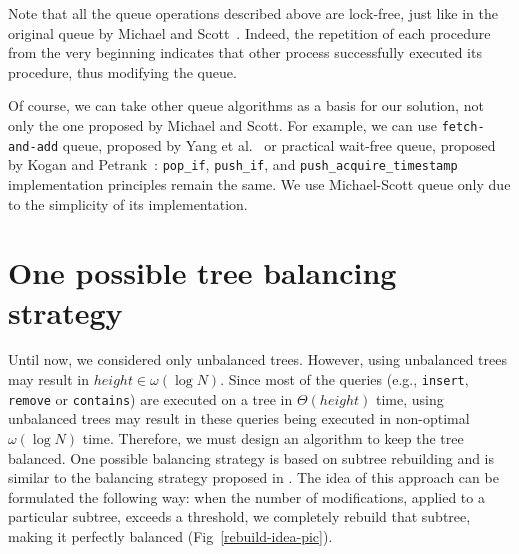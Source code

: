 \documentclass[times, dvipsnames,%
               languages={russian,english} %
              ]{itmo-student-thesis}
\begin{document}
Note that all the queue operations described above are lock-free, just like in the original queue by Michael and Scott~\cite{michael1996simple}. Indeed, the repetition of each procedure from the very beginning indicates that other process successfully executed its procedure, thus modifying the queue.

Of course, we can take other queue algorithms as a basis for our solution, not only the one proposed by Michael and Scott. For example, we can use \texttt{fetch-and-add} queue, proposed by Yang et al.~\cite{yang2016wait} or practical wait-free queue, proposed by Kogan and Petrank~\cite{kogan2011wait}: \texttt{pop\_if}, \texttt{push\_if}, and \texttt{push\_acquire\_timestamp} implementation principles remain the same. We use Michael-Scott queue only due to the simplicity of its implementation. 

\section{One possible tree balancing strategy}
\label{balancing-section}

Until now, we considered only unbalanced trees. However, using unbalanced trees may result in $height \in \omega(\log N)$. Since most of the queries (e.g., \texttt{insert}, \texttt{remove} or \texttt{contains}) are executed on a tree in $\Theta(height)$ time, using unbalanced trees may result in these queries being executed in non-optimal $\omega(\log N)$ time. Therefore, we must design an algorithm to keep the tree balanced. One possible balancing strategy is based on subtree rebuilding and is similar to the balancing strategy proposed in \cite{brown2020non}. The idea of this approach can be formulated the following way: when the number of modifications, applied to a particular subtree, exceeds a threshold, we completely rebuild that subtree, making it perfectly balanced (Fig~\ref{rebuild-idea-pic}).
\end{document}
